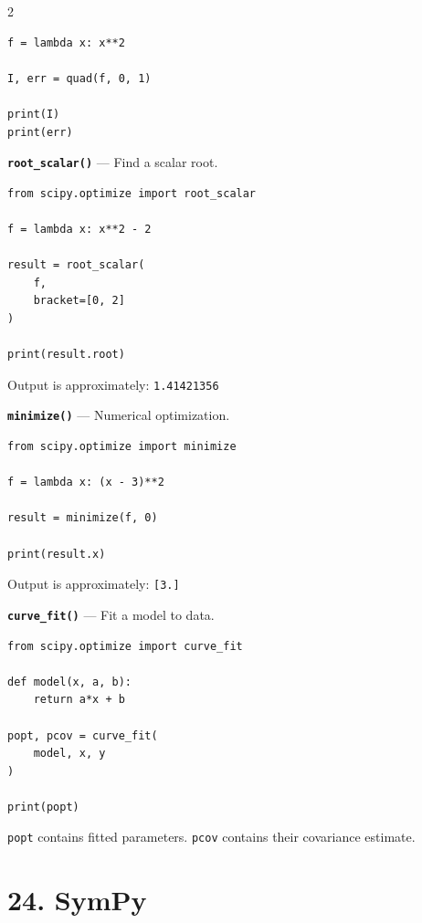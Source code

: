 \documentclass[10pt,a4paper]{article}
\begin{document}
\begin{multicols}{2}
\begin{card}
\begin{lstlisting}[style=pythonstyle]
f = lambda x: x**2

I, err = quad(f, 0, 1)

print(I)
print(err)
\end{lstlisting}
\end{card}

\begin{card}
\textbf{\texttt{root\_scalar()}} --- Find a scalar root.

\begin{lstlisting}[style=pythonstyle]
from scipy.optimize import root_scalar

f = lambda x: x**2 - 2

result = root_scalar(
    f,
    bracket=[0, 2]
)

print(result.root)
\end{lstlisting}

Output is approximately:
\texttt{1.41421356}
\end{card}

\begin{card}
\textbf{\texttt{minimize()}} --- Numerical optimization.

\begin{lstlisting}[style=pythonstyle]
from scipy.optimize import minimize

f = lambda x: (x - 3)**2

result = minimize(f, 0)

print(result.x)
\end{lstlisting}

Output is approximately:
\texttt{[3.]}
\end{card}

\begin{card}
\textbf{\texttt{curve\_fit()}} --- Fit a model to data.

\begin{lstlisting}[style=pythonstyle]
from scipy.optimize import curve_fit

def model(x, a, b):
    return a*x + b

popt, pcov = curve_fit(
    model, x, y
)

print(popt)
\end{lstlisting}

\texttt{popt} contains fitted parameters.
\texttt{pcov} contains their covariance estimate.
\end{card}

\section*{24. SymPy}


\end{multicols}
\end{document}
